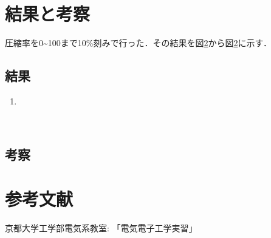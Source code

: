\documentclass[a4paper,11pt]{bxjsarticle}
\begin{document}
\section{結果と考察}
圧縮率を0\textasciitilde100まで10\%刻みで行った．その結果を図\ref{}から図\ref{}に示す．
  \subsection{結果}
  \begin{enumerate}
    \item 
  \end{enumerate}

  　

  \subsection{考察}
    


\section{参考文献}
京都大学工学部電気系教室: 「電気電子工学実習」 \\
\end{document}
